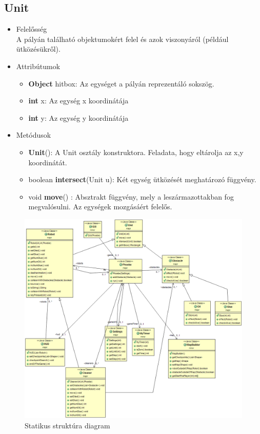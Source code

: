 \begin{itemize}
\begin{itemize}
	\end{itemize}
\end{itemize}

\subsection{Unit}
\begin{itemize}
\item Felelősség\\
A pályán található objektumokért felel és azok viszonyáról (például ütközésükről).
\item Attribútumok
	\begin{itemize}
		\item \textbf{Object} hitbox: Az egységet a pályán reprezentáló sokszög.
		\item \textbf{int} x: Az egység x koordinátája
		\item \textbf{int} y: Az egység y koordinátája
	\end{itemize}
\item Metódusok
	\begin{itemize}
	    \item \textbf{Unit}(): A Unit osztály konstruktora. Feladata, hogy eltárolja az x,y koordinátát.
		\item boolean \textbf{intersect}(Unit u): Két egység ütközését meghatározó függvény.
		\item void \textbf{move}() : Absztrakt függvény, mely a leszármazottakban fog megvalósulni. Az egységek mozgásáért felelős.
	\end{itemize}
\end{itemize}

\begin{figure}[h]
\begin{center}
\includegraphics[width=17cm]{images/struktdiagram.PNG}
\caption{Statikus struktúra diagram}
\label{fig:example3}
\end{center}
\end{figure}
\pagebreak

